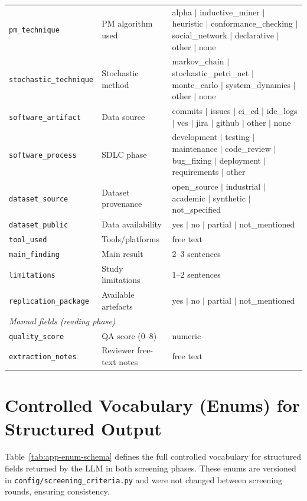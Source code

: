 \begin{table}[htbp]
\begin{tabular}{p{3.4cm} p{4.5cm} p{4.4cm}}
\texttt{pm\_technique}         & PM algorithm used            & alpha $|$ inductive\_miner $|$ heuristic $|$ conformance\_checking $|$ social\_network $|$ declarative $|$ other $|$ none \\
\texttt{stochastic\_technique} & Stochastic method            & markov\_chain $|$ stochastic\_petri\_net $|$ monte\_carlo $|$ system\_dynamics $|$ other $|$ none \\
\texttt{software\_artifact}    & Data source                  & commits $|$ issues $|$ ci\_cd $|$ ide\_logs $|$ vcs $|$ jira $|$ github $|$ other $|$ none \\
\texttt{software\_process}     & SDLC phase                   & development $|$ testing $|$ maintenance $|$ code\_review $|$ bug\_fixing $|$ deployment $|$ requirements $|$ other \\
\texttt{dataset\_source}       & Dataset provenance           & open\_source $|$ industrial $|$ academic $|$ synthetic $|$ not\_specified \\
\texttt{dataset\_public}       & Data availability            & yes $|$ no $|$ partial $|$ not\_mentioned \\
\texttt{tool\_used}            & Tools/platforms              & free text \\
\texttt{main\_finding}         & Main result                  & 2--3 sentences \\
\texttt{limitations}           & Study limitations            & 1--2 sentences \\
\texttt{replication\_package}  & Available artefacts          & yes $|$ no $|$ partial $|$ not\_mentioned \\
\midrule
\multicolumn{3}{l}{\textit{Manual fields (reading phase)}} \\
\texttt{quality\_score}    & QA score (0--8)                  & numeric \\
\texttt{extraction\_notes} & Reviewer free-text notes         & free text \\
\bottomrule
\end{tabular}
\end{table}

\section{Controlled Vocabulary (Enums) for Structured Output}
\label{app:slr-schema}

Table~\ref{tab:app-enum-schema} defines the full controlled vocabulary for
structured fields returned by the LLM in both screening phases. These enums
are versioned in \texttt{config/screening\_criteria.py} and were not changed
between screening rounds, ensuring consistency.


